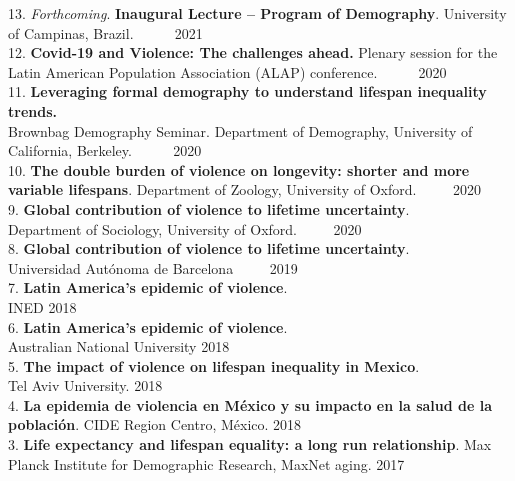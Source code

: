 \documentclass[12pt]{article}
\begin{document}
13. \textit{Forthcoming}. \textbf{Inaugural Lecture -- Program of Demography}. University of Campinas, Brazil. $ \; \qquad $ \hfill { 2021}\\

12. \textbf{Covid-19 and Violence: The challenges ahead.} Plenary session for the Latin American Population Association (ALAP) conference. $ \; \qquad $ \hfill { 2020}\\

11. \textbf{Leveraging formal demography to understand lifespan inequality trends.}\\ Brownbag Demography Seminar. Department of Demography, University of California, Berkeley. $ \; \qquad $ \hfill { 2020}\\

10. \textbf{The double burden of violence on longevity: shorter and more variable lifespans}. Department of Zoology, University of Oxford.$ \; \qquad $ \hfill { 2020}\\

9. \textbf{Global contribution of violence to lifetime uncertainty}. \\ Department of Sociology, University of Oxford.$ \; \qquad $ \hfill { 2020}\\

8. \textbf{Global contribution of violence to lifetime uncertainty}. \\ Universidad Aut\'onoma de Barcelona$ \; \qquad $ \hfill { 2019}\\

7. \textbf{Latin America's epidemic of violence}.\\ INED \hfill { 2018}\\

6. \textbf{Latin America's epidemic of violence}.\\ Australian National University \hfill { 2018}\\

5. \textbf{The impact of violence on lifespan inequality in Mexico}. \\ Tel Aviv University. \hfill { 2018}\\

4. \textbf{La epidemia de violencia en M\'exico y su impacto en la salud de la poblaci\'on}. CIDE Region Centro, M\'exico. \hfill { 2018}\\

3. \textbf{Life expectancy and lifespan equality: a long run relationship}. Max Planck Institute for Demographic Research, MaxNet aging. \hfill { 2017}\\
\end{document}
